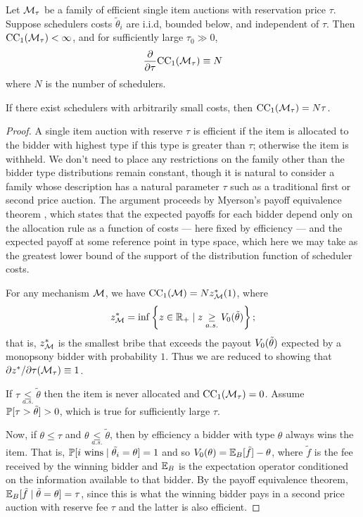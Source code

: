 \begin{theorem}

  Let $\mathcal{M}_\tau$ be a family of efficient single item auctions with reservation price $\tau$.
  Suppose schedulers costs $\tilde\theta_i$ are i.i.d, bounded below, and independent of $\tau$.
  Then $\mathrm{CC}_{1}(\mathcal{M}_\tau)<\infty$, and for sufficiently large $\tau_0\gg 0$,
  \[
    \frac{\partial}{\partial\tau}\mathrm{CC}_{1}(\mathcal{M}_\tau) \equiv N
  \]
  where $N$ is the number of schedulers.

  If there exist schedulers with arbitrarily small costs, then $\mathrm{CC}_{1}(\mathcal{M}_\tau) = N\tau$.
  
\end{theorem}
%
\begin{proof}

  A single item auction with reserve $\tau$ is efficient if the item is allocated to the bidder with highest type if this type is greater than $\tau$; otherwise the item is withheld.
  We don't need to place any restrictions on the family other than the bidder type distributions remain constant, though it is natural to consider a family whose description has a natural parameter $\tau$ such as a traditional first or second price auction.
  The argument proceeds by Myerson's payoff equivalence theorem \cite[Thm.~3.3]{milgrom2004putting}, which states that the expected payoffs for each bidder depend only on the allocation rule as a function of costs --- here fixed by efficiency --- and the expected payoff at some reference point in type space, which here we may take as the greatest lower bound of the support of the distribution function of scheduler costs.

  For any mechanism $\mathcal{M}$, we have $\mathrm{CC}_{1}(\mathcal{M})=Nz^*_{\mathcal{M}}(1)$, where
  \[
    z^*_{\mathcal{M}} = \inf\left\{z\in\mathbb{R}_+ \mid z \underset{a.s.}{\geq} V_0(\tilde{\theta}) \right\};
  \]
  that is, $z^*_{\mathcal{M}}$ is the smallest bribe that exceeds the payout $V_0(\tilde{\theta})$ expected by a monopsony bidder with probability $1$.
  Thus we are reduced to showing that $\partial z^*/\partial\tau (\mathcal{M}_\tau) \equiv 1$.

  If $\tau \underset{a.s.}{\leq} \tilde\theta$ then the item is never allocated and $\mathrm{CC}_{1}(\mathcal{M}_\tau)=0$.
  Assume $\mathbb{P}[\tau > \tilde\theta]>0$, which is true for sufficiently large $\tau$.

  Now, if $\theta\leq \tau$ and $\theta \underset{a.s.}{\leq} \tilde\theta$, then by efficiency a bidder with type $\theta$ always wins the item.
  That is, $\mathbb{P}[i\text{ wins}  \mid \tilde{\theta_i} = \theta] = 1$ and so $V_0(\theta) = \mathbb{E}_B[\tilde{f}] - \theta$, where $\tilde{f}$ is the fee received by the winning bidder and $\mathbb{E}_B$ is the expectation operator conditioned on the information available to that bidder.
  By the payoff equivalence theorem, $\mathbb{E}_B[\tilde{f}\mid\tilde{\theta}=\theta] = \tau$, since this is what the winning bidder pays in a second price auction with reserve fee $\tau$ and the latter is also efficient.
  


\end{proof}

